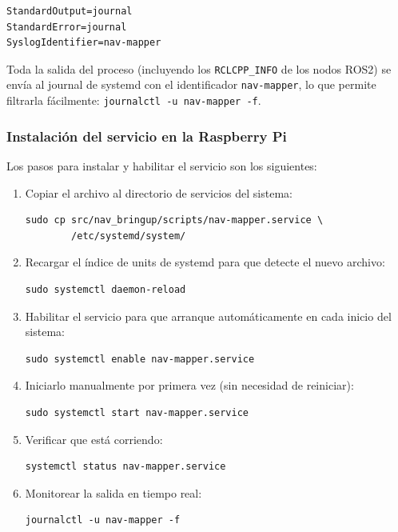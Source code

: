 \begin{verbatim}
StandardOutput=journal
StandardError=journal
SyslogIdentifier=nav-mapper
\end{verbatim}

Toda la salida del proceso (incluyendo los \texttt{RCLCPP\_INFO} de los
nodos ROS2) se envía al journal de systemd con el identificador
\texttt{nav-mapper}, lo que permite filtrarla fácilmente:
\texttt{journalctl -u nav-mapper -f}.

\subsubsection{Instalación del servicio en la Raspberry Pi}

Los pasos para instalar y habilitar el servicio son los siguientes:

\begin{enumerate}
  \item Copiar el archivo al directorio de servicios del sistema:
\begin{verbatim}
sudo cp src/nav_bringup/scripts/nav-mapper.service \
        /etc/systemd/system/
\end{verbatim}

  \item Recargar el índice de units de systemd para que detecte el nuevo
        archivo:
\begin{verbatim}
sudo systemctl daemon-reload
\end{verbatim}

  \item Habilitar el servicio para que arranque automáticamente en cada
        inicio del sistema:
\begin{verbatim}
sudo systemctl enable nav-mapper.service
\end{verbatim}

  \item Iniciarlo manualmente por primera vez (sin necesidad de reiniciar):
\begin{verbatim}
sudo systemctl start nav-mapper.service
\end{verbatim}

  \item Verificar que está corriendo:
\begin{verbatim}
systemctl status nav-mapper.service
\end{verbatim}

  \item Monitorear la salida en tiempo real:
\begin{verbatim}
journalctl -u nav-mapper -f
\end{verbatim}
\end{enumerate}

